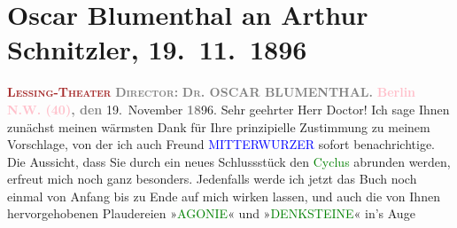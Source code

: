 

               \section[Oscar Blumenthal an Arthur Schnitzler, 19. 11. 1896]{ Oscar Blumenthal an Arthur Schnitzler, 19. 11. 1896}\nopagebreak{}\rehead{ }\normalsize\beginnumbering{} \toendnotes[C]{\smallbreak\pagebreak[2]} 
\toendnotes[C]{\smallbreak}\pstart
           \noindent{}\centering{}{\pb}\textcolor{gray}{\textbf{\textcolor{brown}{\textsc{Lessing-Theater}}{}\ledrightnote{\textcolor{brown}{Lessing-Theater}}}}\pend
           \pstart
           \noindent{}\centering{}\textcolor{gray}{\textbf{\textsc{Director}:}}{ }\textcolor{gray}{\textbf{\textsc{Dr.}{ }OSCAR BLUMENTHAL.}}\pend
           \pstart
           \noindent{}\raggedleft{}\textcolor{gray}{\textbf{\textcolor{pink}{Berlin N.W. (40)}{}\ledrightnote{\textcolor{pink}{Berlin}}, den}}{ }19. November \textcolor{gray}{\textbf{18}}96.\pend
           \pstart\center{}Sehr geehrter Herr Doctor!\pend\pstart
           Ich sage Ihnen zunächst meinen wärmsten Dank für Ihre prinzipielle Zustimmung zu
                    meinem Vorschlage, von der ich auch Freund \textcolor{blue}{MITTERWURZER}{}\ledrightnote{\textcolor{blue}{Friedrich Mitterwurzer}} sofort benachrichtige. Die
                    Aussicht, dass Sie durch ein neues Schlussstück den \textcolor{green}{Cyclus}{} abrunden werden, erfreut mich noch ganz
                    besonders. Jedenfalls werde ich jetzt das Buch noch einmal von Anfang bis zu
                    Ende auf mich wirken lassen, und auch die von Ihnen hervorgehobenen Plaudereien
                        »\textcolor{green}{AGONIE}{}\ledrightnote{\textcolor{green}{Agonie}}« und »\textcolor{green}{DENKSTEINE}{}\ledrightnote{\textcolor{green}{Denksteine}}« in’s Auge
